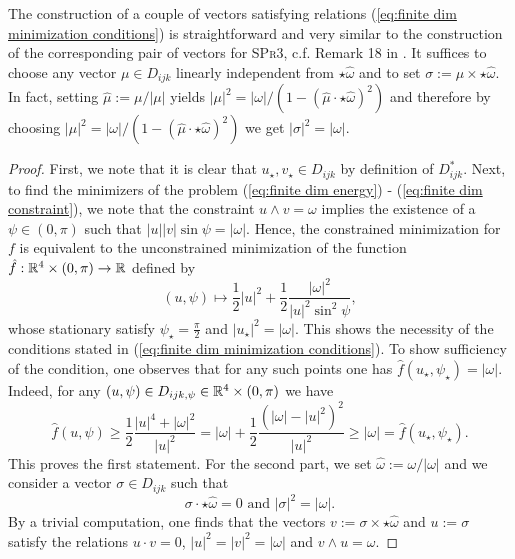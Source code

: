 \begin{remark}
The construction of a couple of vectors satisfying relations (\ref{eq:finite dim minimization conditions}) is straightforward and very similar to the construction of the corresponding pair of vectors for \textsc{SPr3}, c.f. Remark 18 in \cite{Alouges2017}. It suffices to choose any vector $\mu \in D_{ijk}$ linearly independent from $\star \hat{\omega}$ and to set $\sigma := \mu \times \star\hat{\omega}$. In fact, setting $\hat{\mu} := \mu / |\mu|$ yields $|\mu|^2 = |\omega|/(1 - (\hat{\mu} \cdot \star\hat{\omega})^2)$ and therefore by choosing $|\mu|^2 = |\omega|/(1 - (\hat{\mu} \cdot \star \hat{\omega})^2)$ we get $|\sigma|^2 = |\omega|$.
\end{remark}

\begin{proof}
First, we note that it is clear that $u_{\star}, v_{\star} \in D_{ijk}$ by definition of $D_{ijk}^{*}$.
Next, to find the minimizers of the problem (\ref{eq:finite dim energy}) - (\ref{eq:finite dim constraint}), we note that the constraint $u \wedge v = \omega$ implies the existence of a $\psi \in (0, \pi)$ such that $|u||v| \sin \psi= |\omega|$. Hence, the constrained minimization for $f$ is equivalent to the unconstrained minimization of the function $\hat{f}: \mathbb{R}^4 \times (0, \pi) \to \mathbb{R}$ defined by
\begin{equation}
(u, \psi) \mapsto \frac{1}{2} |u|^2 + \frac{1}{2} \frac{|\omega|^2}{|u|^2 \sin^2\psi},
\end{equation}
whose stationary satisfy $\psi_{\star} = \frac{\pi}{2}$ and $|u_{\star}|^2 = |\omega|$. This shows the necessity of the conditions stated in (\ref{eq:finite dim minimization conditions}). To show sufficiency of the condition, one observes that for any such points one has $\hat{f}(u_{\star}, \psi_{\star}) = |\omega|$. Indeed, for any $(u, \psi) \in D_{ijk, \psi} \in \mathbb{R}^4 \times (0, \pi)$ we have
\begin{equation}
\hat{f}(u, \psi) \geq \frac{1}{2} \frac{|u|^4 + |\omega|^2}{|u|^2} = |\omega| + \frac{1}{2}\frac{(|\omega| - |u|^2)^2}{|u|^2} \geq |\omega| = \hat{f}(u_{\star}, \psi_{\star}).
\end{equation}
This proves the first statement. For the second part, we set $\hat{\omega} := \omega/|\omega|$ and we consider a vector $\sigma \in D_{ijk}$ such that
\begin{equation}
	\sigma \cdot \star\hat{\omega} = 0 \text{ and } |\sigma|^2 = |\omega|. 
\end{equation}
By a trivial computation, one finds that the vectors $v := \sigma \times \star \hat{\omega}$ and $u := \sigma$ satisfy the relations $u \cdot v = 0$, $|u|^2 = |v|^2 = |\omega|$ and $v \wedge u = \omega$. 
\end{proof}

